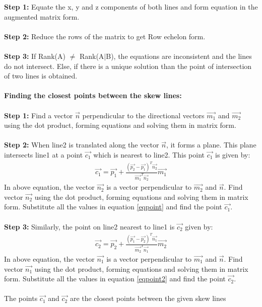 \documentclass[journal,12pt,twocolumn]{IEEEtran}
\begin{document}
\textbf{Step 1:} Equate the x, y and z components of both  lines  and  form  equation  in  the  augmented matrix form. \\ \\
\textbf{Step 2:} Reduce the rows of the matrix to get Row echelon form. \\ \\
\textbf{Step 3:} If Rank(A) $\neq$ Rank(A$\mid$B), the equations are inconsistent and the lines do not intersect. Else, if there is a unique solution than the point of intersection of two lines is obtained.
\\
\\
\textbf{Finding the closest points between the skew lines:} \\ \\
\textbf{Step 1:} Find a vector $\Vec{n}$ perpendicular to the directional vectors $\Vec{m_1}$ and $\Vec{m_2}$ using the dot product, forming equations and solving them in matrix form. \\ \\
\textbf{Step 2:} When line2 is translated along the vector $\Vec{n}$, it forms a plane. This plane intersects line1 at a point $\Vec{c_1}$ which is nearest to line2. This point $\Vec{c_1}$ is given by:
\begin{align}
\vec{c_1}=\vec{p_1}+\frac{(\vec{p_2}-\vec{p_1})^T \vec{n_2}}{\vec{m_1}^T \vec{n_2}}\vec{m_1} \label{eqpoint}
\end{align}
In above equation, the vector $\Vec{n_2}$ is a vector perpendicular to $\Vec{m_2}$ and $\Vec{n}$. Find vector $\Vec{n_2}$ using the dot product, forming equations and solving them in matrix form. Substitute all the values in equation \ref{eqpoint} and find the point $\Vec{c_1}$. \\ \\
\textbf{Step 3:} Similarly, the point on line2 nearest to line1 is $\Vec{c_2}$ given by:
\begin{align}
\vec{c_2}=\vec{p_2}+\frac{(\vec{p_1}-\vec{p_2})^T \vec{n_1}}{\vec{m_2}^T \vec{n_1}}\vec{m_2} \label{eqpoint2}
\end{align}
In above equation, the vector $\Vec{n_1}$ is a vector perpendicular to $\Vec{m_1}$ and $\Vec{n}$. Find vector $\Vec{n_1}$ using the dot product, forming equations and solving them in matrix form. Substitute all the values in equation \ref{eqpoint2} and find the point $\Vec{c_2}$. \\ \\
The points $\Vec{c_1}$ and  $\Vec{c_2}$ are the closest points between the given skew lines \\ \\
\end{document}
